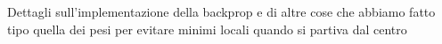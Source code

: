 Dettagli sull'implementazione della backprop e di altre cose che abbiamo fatto tipo quella dei pesi per evitare minimi locali quando si partiva dal centro